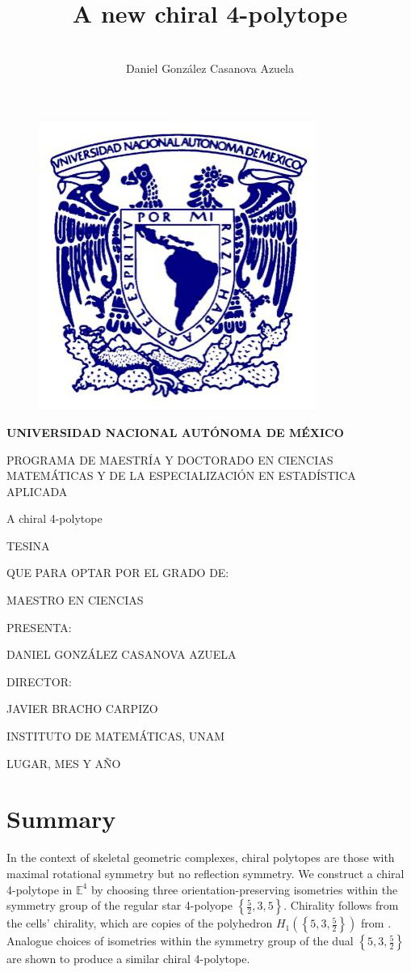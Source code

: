 \documentclass[spanish]{article}
\title{A new chiral 4-polytope}
\author{\\Daniel González Casanova Azuela}
\date{}
\theoremstyle{definition}
\newcommand{\E}{\mathbb{E}}
\begin{document}
\thispagestyle{empty}
\begin{figure}[H]
	\centering
	\includegraphics[width=0.3\linewidth]{img1}
\end{figure}

\begin{center}
	\textbf{UNIVERSIDAD NACIONAL AUTÓNOMA DE MÉXICO}
	
	PROGRAMA DE MAESTRÍA Y DOCTORADO EN CIENCIAS MATEMÁTICAS Y DE LA ESPECIALIZACIÓN EN ESTADÍSTICA APLICADA
	
	\vspace{2cm}
	{\Large A chiral 4-polytope}
	\vspace{1.2cm}
	
	TESINA
	
	QUE PARA OPTAR POR EL GRADO DE:
	
	MAESTRO EN CIENCIAS
	\vspace{1.2cm}
	
	PRESENTA:
	
	DANIEL GONZÁLEZ CASANOVA AZUELA
	\vspace{1.2cm}
	
	DIRECTOR:
	
	JAVIER BRACHO CARPIZO
	
	INSTITUTO DE MATEMÁTICAS, UNAM
	\vspace{1.2cm}
	
	LUGAR, MES Y AÑO
\end{center}

\clearpage
	
	
	\section*{Summary}
	In the context of skeletal geometric complexes, chiral polytopes are those with maximal rotational symmetry but no reflection symmetry. We construct a chiral 4-polytope in $\E^4$ by choosing three orientation-preserving isometries within the symmetry group of the regular star 4-polyope $\left\{\frac{5}{2},3,5\right\}$. 	Chirality follows from the cells' chirality, which are copies of the polyhedron $H_1(\left\{5,3,\frac{5}{2}\right\})$ from \cite{petcox}. Analogue choices of isometries within the symmetry group of the dual $\left\{5,3,\frac{5}{2}\right\}$ are shown to produce a similar chiral 4-polytope.
	
\end{document}
